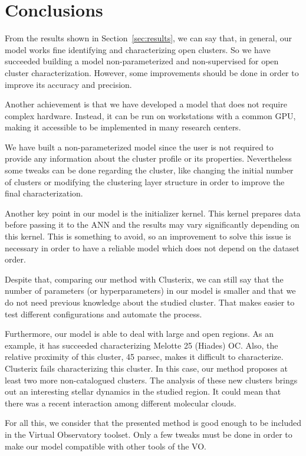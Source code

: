 \documentclass[11pt,a4paper,english,twocolumn]{article}
\begin{document}
\section{Conclusions}

From the results shown in Section~\ref{sec:results}, we can say that, in general,
our model works fine identifying and characterizing open clusters.
So we have succeeded building a model non-parameterized and non-supervised
for open cluster characterization. However, some improvements should be done
in order to improve its accuracy and precision.

Another achievement is that we have developed a model that does not require
complex hardware. Instead, it can be run on workstations with a common GPU,
making it accessible to be implemented in many research centers.

We have built a non-parameterized model since the user is not required to provide
any information about the cluster profile or its properties.
Nevertheless some tweaks can be done regarding the cluster, like changing the initial
number of clusters or modifying the clustering layer structure in order to improve
the final characterization.

Another key point in our model is the initializer kernel.
This kernel prepares data before passing it to the ANN
and the results may vary significantly depending on this kernel.
This is something to avoid, so an improvement to solve this issue is necessary
in order to have a reliable model which does not depend on the dataset order.

Despite that, comparing our method with Clusterix, we can still say that the
number of parameters (or hyperparameters) in our model is smaller and that
we do not need previous knowledge about the studied cluster.
That makes easier to test different configurations and automate the process.

Furthermore, our model is able to deal with large and open regions. As an example,
it has succeeded characterizing Melotte 25 (Hiades) OC. Also, the relative proximity
of this cluster, 45 parsec, makes it difficult to characterize. Clusterix fails
characterizing this cluster. In this case, our method proposes at least two more
non-catalogued clusters. The analysis of these new clusters brings out an interesting
stellar dynamics in the studied region. It could mean that there was a recent
interaction among different molecular clouds.

For all this, we consider that the presented method is good enough to be included
in the Virtual Observatory toolset. Only a few tweaks must be done in order to make
our model compatible with other tools of the VO.
\end{document}
